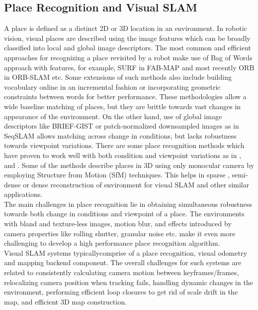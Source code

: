 \subsection{Place Recognition and Visual SLAM}
A place is defined as a distinct 2D or 3D location in an environment. In robotic vision, visual places are described using the image features which can be broadly classified into local and global image descriptors. The most common and efficient approaches for recognizing a place revisited by a robot make use of Bag of Words approach with features, for example, SURF in FAB-MAP \cite{Cummins2010} and most recently ORB in ORB-SLAM \cite{Montiel2015} etc. Some extensions of such methods also include building vocabulary online in an incremental fashion or incorporating geometric constraints between words for better performance. These methodologies allow a wide baseline matching of places, but they are brittle towards vast changes in appearance of the environment. On the other hand, use of global image descriptors like BRIEF-GIST \cite{Sunderhauf2011} or patch-normalized downsampled images as in SeqSLAM \cite{Milford2012} allows matching across change in conditions, but lacks robustness towards viewpoint variations. There are some place recognition methods which have proven to work well with both condition and viewpoint variations as in \cite{McManus2014}, \cite{Milford2008} and \cite{Niko2015}. Some of the methods describe places in 3D using only monocular camera by employing Structure from Motion (SfM) techniques. This helps in sparse \cite{Montiel2015}, semi-dense \cite{Engel2014lsd, Mur-Artal2015b} or dense \cite{Newcombe2011} reconstruction of environment for visual SLAM and other similar applications.
\\
The main challenges in place recognition lie in obtaining simultaneous robustness towards both change in conditions and viewpoint of a place. The environments with bland and texture-less images, motion blur, and effects introduced by camera properties like rolling shutter, granular noise etc. make it even more challenging to develop a high performance place recognition algorithm.
\\
Visual SLAM systems typicallycomprise of a place recognition, visual odometry and mapping backend component. The overall challenges for such systems are related to consistently calculating camera motion between keyframes/frames, relocalizing camera position when tracking fails, handling dynamic changes in the environment, performing efficient loop closures to get rid of scale drift in the map, and efficient 3D map construction.
